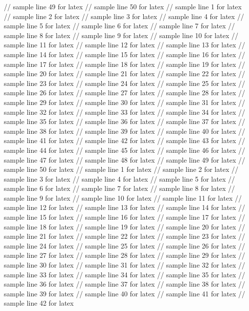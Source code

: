 // sample line 49 for latex
// sample line 50 for latex
// sample line 1 for latex
// sample line 2 for latex
// sample line 3 for latex
// sample line 4 for latex
// sample line 5 for latex
// sample line 6 for latex
// sample line 7 for latex
// sample line 8 for latex
// sample line 9 for latex
// sample line 10 for latex
// sample line 11 for latex
// sample line 12 for latex
// sample line 13 for latex
// sample line 14 for latex
// sample line 15 for latex
// sample line 16 for latex
// sample line 17 for latex
// sample line 18 for latex
// sample line 19 for latex
// sample line 20 for latex
// sample line 21 for latex
// sample line 22 for latex
// sample line 23 for latex
// sample line 24 for latex
// sample line 25 for latex
// sample line 26 for latex
// sample line 27 for latex
// sample line 28 for latex
// sample line 29 for latex
// sample line 30 for latex
// sample line 31 for latex
// sample line 32 for latex
// sample line 33 for latex
// sample line 34 for latex
// sample line 35 for latex
// sample line 36 for latex
// sample line 37 for latex
// sample line 38 for latex
// sample line 39 for latex
// sample line 40 for latex
// sample line 41 for latex
// sample line 42 for latex
// sample line 43 for latex
// sample line 44 for latex
// sample line 45 for latex
// sample line 46 for latex
// sample line 47 for latex
// sample line 48 for latex
// sample line 49 for latex
// sample line 50 for latex
// sample line 1 for latex
// sample line 2 for latex
// sample line 3 for latex
// sample line 4 for latex
// sample line 5 for latex
// sample line 6 for latex
// sample line 7 for latex
// sample line 8 for latex
// sample line 9 for latex
// sample line 10 for latex
// sample line 11 for latex
// sample line 12 for latex
// sample line 13 for latex
// sample line 14 for latex
// sample line 15 for latex
// sample line 16 for latex
// sample line 17 for latex
// sample line 18 for latex
// sample line 19 for latex
// sample line 20 for latex
// sample line 21 for latex
// sample line 22 for latex
// sample line 23 for latex
// sample line 24 for latex
// sample line 25 for latex
// sample line 26 for latex
// sample line 27 for latex
// sample line 28 for latex
// sample line 29 for latex
// sample line 30 for latex
// sample line 31 for latex
// sample line 32 for latex
// sample line 33 for latex
// sample line 34 for latex
// sample line 35 for latex
// sample line 36 for latex
// sample line 37 for latex
// sample line 38 for latex
// sample line 39 for latex
// sample line 40 for latex
// sample line 41 for latex
// sample line 42 for latex
